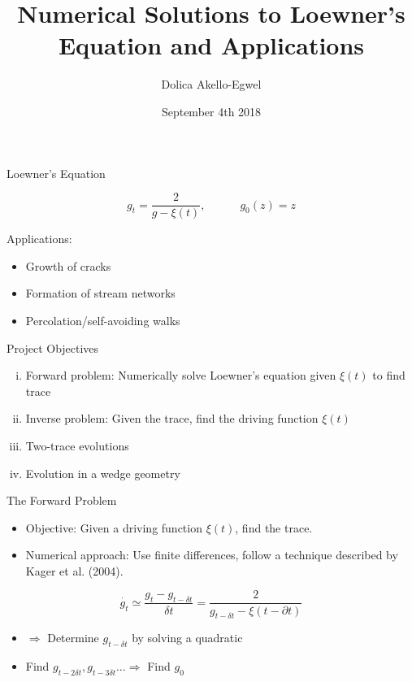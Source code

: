 \documentclass{beamer}
\title[]{Numerical Solutions to Loewner's Equation and Applications}
\author{Dolica Akello-Egwel}
\date{September 4th 2018}
\begin{document}
\begin{frame}
\titlepage
\end{frame}

\begin{frame}{Loewner's Equation}
\begin{adjustbox}{max totalsize={.9\textwidth}{.7\textheight},center}

\end{adjustbox}

$$g_t = \frac{2}{g - \xi(t)}, \quad\quad\quad g_0(z) = z$$

Applications:
\begin{itemize}
\item Growth of cracks
\item Formation of stream networks
\item Percolation/self-avoiding walks
\end{itemize}
\end{frame}

\begin{frame}{Project Objectives}
    \begin{enumerate}[(i)]
    \item Forward problem: Numerically solve Loewner's equation given $\xi(t)$ to find trace
    \item Inverse problem: Given the trace, find the driving function $\xi(t)$
    \item Two-trace evolutions
    \item Evolution in a wedge geometry
\end{enumerate}
\end{frame}

\begin{frame}{The Forward Problem}
    \begin{itemize}
        \item Objective: Given a driving function $\xi(t)$, find the trace.
        \item Numerical approach: Use finite differences, follow a technique described by Kager et al. (2004).
    \end{itemize}

    \begin{equation*}
        \dot{g_t} \simeq \frac{g_t - g_{t - \delta t}}{\delta t} = \frac{2}{g_{t - \delta t} - \xi(t - \partial t)}
    \end{equation*}

    \begin{itemize}
        \item $\Rightarrow$ Determine $g_{t - \delta t}$ by solving a quadratic
        \item  Find $g_{t - 2\delta t},g_{t - 3\delta t} \dots \Rightarrow$ Find $g_0$
    \end{itemize}

\end{frame}
\end{document}
